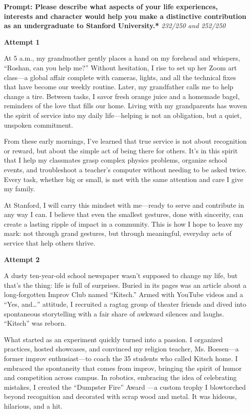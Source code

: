 \documentclass[10pt]{article}
\newcommand{\mybox}[3]{
    \begin{minipage}{\textwidth} %
        \begin{tcolorbox}[colback=grey, colframe=black, boxrule=0.5mm, width=\textwidth, sharp corners=south, enhanced]
            \textbf{#1} \textit{#2}
        \end{tcolorbox}
        \vspace{-16pt}
        \begin{tcolorbox}[colback=white, colframe=black, boxrule=0.5mm, width=\textwidth, sharp corners=north, top=0pt, enhanced]
            \vspace{1em}
            \setlength{\parskip}{1em}
            #3
        \end{tcolorbox}
    \end{minipage}
    \vspace{1em}
}
\begin{document}
\mybox{Prompt: Please describe what aspects of your life experiences, interests and character would help you make a distinctive contribution as an undergraduate to Stanford University.*}{232/250 and 252/250}{

\textbf{Attempt 1}

At 5 a.m., my grandmother gently places a hand on my forehead and whispers, “Roshan, can you help me?” Without hesitation, I rise to set up her Zoom art class—a global affair complete with cameras, lights, and all the technical fixes that have become our weekly routine. Later, my grandfather calls me to help change a tire. Between tasks, I savor fresh orange juice and a homemade bagel, reminders of the love that fills our home. Living with my grandparents has woven the spirit of service into my daily life—helping is not an obligation, but a quiet, unspoken commitment.

From these early mornings, I’ve learned that true service is not about recognition or reward, but about the simple act of being there for others. It’s in this spirit that I help my classmates grasp complex physics problems, organize school events, and troubleshoot a teacher’s computer without needing to be asked twice. Every task, whether big or small, is met with the same attention and care I give my family.

At Stanford, I will carry this mindset with me—ready to serve and contribute in any way I can. I believe that even the smallest gestures, done with sincerity, can create a lasting ripple of impact in a community. This is how I hope to leave my mark: not through grand gestures, but through meaningful, everyday acts of service that help others thrive.

\textbf{Attempt 2}

A dusty ten-year-old school newspaper wasn't supposed to change my life, but that's the thing: life is full of surprises. Buried in its pages was an article about a long-forgotten Improv Club named “Kitsch.” Armed with YouTube videos and a “Yes, and…” attitude, I recruited a ragtag group of theater friends and dived into spontaneous storytelling with a fair share of awkward silences and laughs. “Kitsch” was reborn.

What started as an experiment quickly turned into a passion. I organized practices, hosted showcases, and convinced my religion teacher, Ms. Boesen—a former improv enthusiast—to coach the 35 students who called Kitsch home. I embraced the spontaneity that comes from improv, bringing the spirit of humor and competition across campus. In robotics, embracing the idea of celebrating mistakes, I created the “Dumpster Fire” Award —a custom trophy I blowtorched beyond recognition and decorated with scrap wood and metal. It was hideous, hilarious, and a hit.

}
\end{document}
